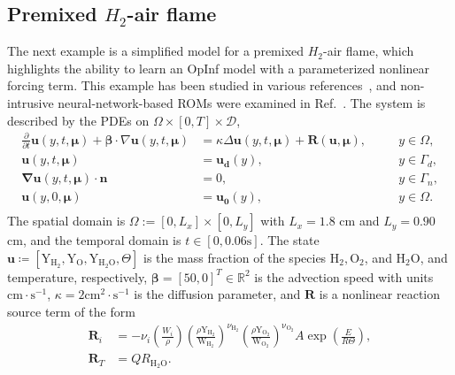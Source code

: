 \documentclass[3p,computermodern,11pt]{elsarticle}
\numberwithin{equation}{section}
\newcommand{\HTwoO}{\mathrm{H}_2\mathrm{O}}
\newcommand{\defeq}{:=}
\newcommand{\params}{\boldsymbol \mu}
\newcommand{\paramDomain}{\mathcal{D}}
\newcommand{\RR}[1]{\mathbb{R}^{#1}}
\begin{document}
\subsection{Premixed $H_2$-air flame}

The next example is a simplified model for a premixed $H_2$-air flame, which highlights the ability to learn an OpInf model with a parameterized nonlinear forcing term. This example has been studied in various references~\cite{LeCa20,GaWaZh20,BuWi10}, and non-intrusive neural-network-based ROMs were examined in Ref.~\cite{GaWaZh20}. The system is described by the PDEs on $\Omega \times [0,T] \times \paramDomain$, 
\begin{equation}
\begin{aligned}
\frac{\partial }{\partial t} \boldsymbol{u}(y,t,\params) + \boldsymbol{\beta} \cdot \nabla \boldsymbol{u} (y,t,\params) &= \kappa \Delta \boldsymbol{u} (y,t,\params) + \boldsymbol{R}(\boldsymbol{u}, \params), & \quad & y \in \Omega, \\
\boldsymbol{u} (y,t,\params) &= \boldsymbol{u_d}(y), & \quad & y \in \Gamma_d, \\
\boldsymbol{\nabla}  \boldsymbol u (y,t,\params) \cdot \boldsymbol{n} &= 0, & \quad & y \in \Gamma_n, \\
\boldsymbol{u}(y,0,\params) &= \boldsymbol{u_0}(y), & \quad & y \in \Omega. \\
\end{aligned}
\end{equation}
The spatial domain is $\Omega \defeq \left[0,L_x\right] \times \left[0,L_y \right]$ with $L_x = 1.8$ $\mathrm{cm}$ and $L_y = 0.90$ $\mathrm{cm}$, and the temporal domain is $t \in [0, 0.06 \mathrm{s}]$.
The state $\boldsymbol u \coloneqq \left[ \mathrm{Y}_{\mathrm{H}_2},\mathrm{Y}_\mathrm{O},\mathrm{Y}_{\mathrm{H}_2\mathrm{O}}, \Theta \right]$ is the mass fraction of the species $\mathrm{H}_2, \mathrm{O}_2$, and $\mathrm{H}_{2}\mathrm{O}$, and temperature, respectively, $\boldsymbol \beta  = \left[ 50 , 0 \right]^T\in \RR{2}$ is the advection speed with units $\mathrm{cm}\cdot \mathrm{s}^{-1}$, $\kappa = \mathrm{2} \mathrm{cm}^2 \cdot \mathrm{s}^{-1}$ is the diffusion parameter, and $\boldsymbol R$ is a nonlinear reaction source term of the form
\begin{equation}
\begin{aligned}
\boldsymbol R_i &= -\nu_i \left( \frac{W_i}{\rho} \right) \left( \frac{\rho \mathrm{Y}_{\mathrm{H}_2}}{\mathrm{W}_{\mathrm{H}_2}}  \right)^{\nu_{\mathrm{H}_2}} \left( \frac{\rho \mathrm{Y}_{\mathrm{O}_2}}{\mathrm{W}_{\mathrm{O}_2}}  \right)^{\mathrm{\nu}_{\mathrm{O}_2}} A \exp \left( \frac{E}{R \Theta} \right), \\
\boldsymbol R_T &= Q R_{\HTwoO}.
\end{aligned}
\end{equation}
\end{document}
